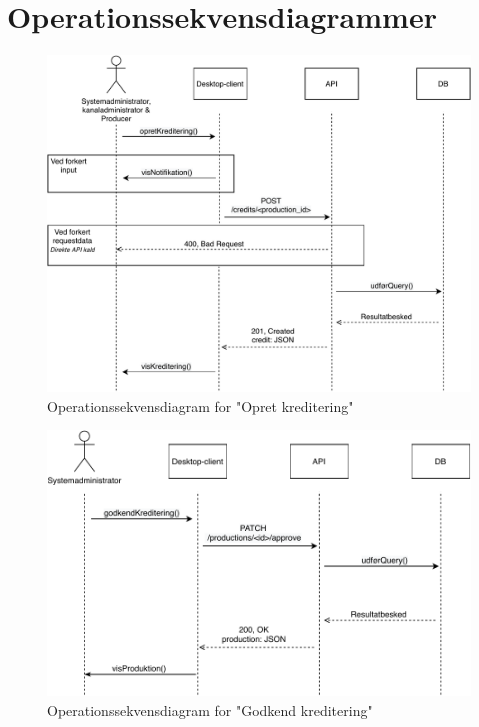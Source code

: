 \section{Operationssekvensdiagrammer}{\label{section: operationssekvensdiagrammer}}

\begin{figure}[H]
\centering
\includegraphics[scale=0.7]{figures/Operationssekvensdiagrammer/opretKreditering.pdf}
\caption{Operationssekvensdiagram for "Opret kreditering"}
\label{fig:op_create_credit}
\end{figure}

\begin{figure}[H]
\centering
\includegraphics[scale=0.7]{figures/Operationssekvensdiagrammer/godkendKrediteringSysAdm.pdf}
\caption{Operationssekvensdiagram for "Godkend kreditering"}
\label{fig:op_approve_credit}
\end{figure}


